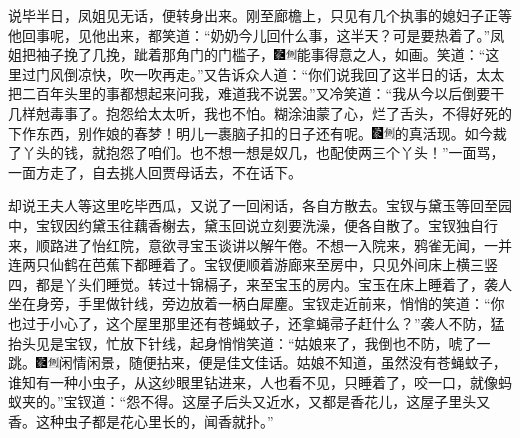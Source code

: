 说毕半日，凤姐见无话，便转身出来。刚至廊檐上，只见有几个执事的媳妇子正等他回事呢，见他出来，都笑道：``奶奶今儿回什么事，这半天？可是要热着了。''凤姐把袖子挽了几挽，跐着那角门的门槛子，{\includegraphics[width=3mm]{../Images/00006}\includegraphics[width=3mm]{../Images/00011}\footnotesize \kaishu 能事得意之人，如画。}笑道：``这里过门风倒凉快，吹一吹再走。''又告诉众人道：``你们说我回了这半日的话，太太把二百年头里的事都想起来问我，难道我不说罢。''又冷笑道：``我从今以后倒要干几样尅毒事了。抱怨给太太听，我也不怕。糊涂油蒙了心，烂了舌头，不得好死的下作东西，别作娘的春梦！明儿一裹脑子扣的日子还有呢。{\includegraphics[width=3mm]{../Images/00006}\includegraphics[width=3mm]{../Images/00011}\footnotesize \kaishu 的真活现。}如今裁了丫头的钱，就抱怨了咱们。也不想一想是奴几，也配使两三个丫头！''一面骂，一面方走了，自去挑人回贾母话去，不在话下。

却说王夫人等这里吃毕西瓜，又说了一回闲话，各自方散去。宝钗与黛玉等回至园中，宝钗因约黛玉往藕香榭去，黛玉回说立刻要洗澡，便各自散了。宝钗独自行来，顺路进了怡红院，意欲寻宝玉谈讲以解午倦。不想一入院来，鸦雀无闻，一并连两只仙鹤在芭蕉下都睡着了。宝钗便顺着游廊来至房中，只见外间床上横三竖四，都是丫头们睡觉。转过十锦槅子，来至宝玉的房内。宝玉在床上睡着了，袭人坐在身旁，手里做针线，旁边放着一柄白犀麈。宝钗走近前来，悄悄的笑道：``你也过于小心了，这个屋里那里还有苍蝇蚊子，还拿蝇帚子赶什么？''袭人不防，猛抬头见是宝钗，忙放下针线，起身悄悄笑道：``姑娘来了，我倒也不防，唬了一跳。{\includegraphics[width=3mm]{../Images/00006}\includegraphics[width=3mm]{../Images/00011}\footnotesize \kaishu 闲情闲景，随便拈来，便是佳文佳话。}姑娘不知道，虽然没有苍蝇蚊子，谁知有一种小虫子，从这纱眼里钻进来，人也看不见，只睡着了，咬一口，就像蚂蚁夹的。''宝钗道：``怨不得。这屋子后头又近水，又都是香花儿，这屋子里头又香。这种虫子都是花心里长的，闻香就扑。''

